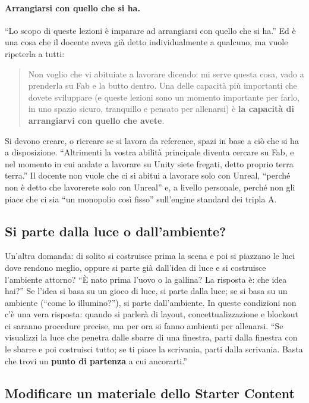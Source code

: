 \paragraph{Arrangiarsi con quello che si ha.} ``Lo scopo di queste lezioni è
imparare ad arrangiarsi con quello che si ha.'' Ed è una cosa che il docente aveva già
detto individualmente a qualcuno, ma vuole ripeterla a tutti:
\begin{quote}
Non voglio che vi abituiate a lavorare dicendo: mi serve questa cosa, vado a prenderla
su Fab e la butto dentro. Una delle capacità più importanti che dovete sviluppare
(e queste lezioni sono un momento importante per farlo, in uno spazio sicuro,
tranquillo e pensato per allenarsi) è \textbf{la capacità di arrangiarvi con quello
che avete}.
\end{quote}
Si devono creare, o ricreare se si lavora da reference, spazi in base a ciò che si
ha a disposizione. ``Altrimenti la vostra abilità principale diventa cercare su Fab,
e nel momento in cui andate a lavorare su Unity siete fregati, detto proprio terra
terra.'' Il docente non vuole che ci si abitui a lavorare solo con Unreal, ``perché
non è detto che lavorerete solo con Unreal'' e, a livello personale, perché non gli
piace che ci sia ``un monopolio così fisso'' sull'engine standard dei tripla A.

\subsection{Si parte dalla luce o dall'ambiente?}

Un'altra domanda: di solito si costruisce prima la scena e poi si piazzano le luci
dove rendono meglio, oppure si parte già dall'idea di luce e si costruisce l'ambiente
attorno? ``È nato prima l'uovo o la gallina? La risposta è: che idea hai?'' Se l'idea
si basa su un gioco di luce, si parte dalla luce; se si basa su un ambiente (``come
lo illumino?''), si parte dall'ambiente. In queste condizioni non c'è una vera
risposta: quando si parlerà di layout, concettualizzazione e blockout ci saranno
procedure precise, ma per ora si fanno ambienti per allenarsi. ``Se visualizzi la
luce che penetra dalle sbarre di una finestra, parti dalla finestra con le sbarre e
poi costruisci tutto; se ti piace la scrivania, parti dalla scrivania. Basta che
trovi un \textbf{punto di partenza} a cui ancorarti.''

\subsection{Modificare un materiale dello Starter Content}

